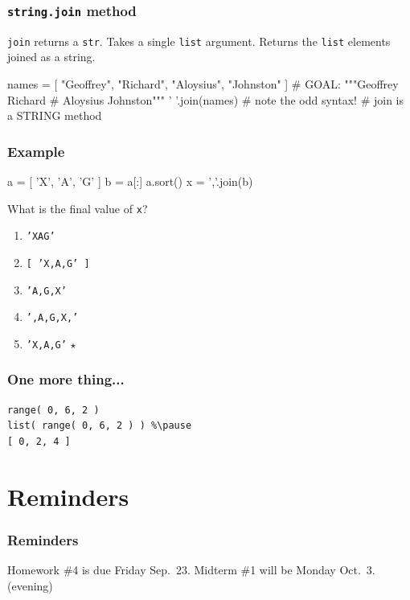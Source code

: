 \documentclass[11pt]{beamer}
\begin{document}
\begin{frame}[fragile]
  \frametitle{\texttt{string.join} method}
  \Enlarge

  \begin{itemize}
  \myitem  \texttt{join} returns a \texttt{str}. %
  \myitem  Takes a single \texttt{list} argument. %
  \myitem  Returns the \texttt{list} elements joined as a string. %
  \end{itemize}
  \begin{semiverbatim}
names = [ "Geoffrey", "Richard",
          "Aloysius", "Johnston" ]
#  GOAL:  """Geoffrey Richard
#            Aloysius Johnston""" %
' '.join(names)     # note the odd syntax!
                    # join is a STRING method
  \end{semiverbatim}
\end{frame}

\begin{frame}[fragile]
  \frametitle{Example}
  \Enlarge

  \begin{semiverbatim}
a = [ 'X', 'A', 'G' ]
b = a[:]
a.sort()
x = ','.join(b)
  \end{semiverbatim}
  What is the final value of \texttt{x}?
  \begin{enumerate}[label=\Alph*]
  \item  \texttt{'XAG'}
  \item  \texttt{[ 'X,A,G' ]}
  \item  \texttt{'A,G,X'}
  \item  \texttt{',A,G,X,'}
  \item  \texttt{'X,A,G'}  $\star$
  \end{enumerate}
\end{frame}

\begin{frame}[fragile]
  \frametitle{One more thing...}
  \Enlarge

  \begin{Verbatim}
range( 0, 6, 2 )
list( range( 0, 6, 2 ) ) %\pause
[ 0, 2, 4 ]
  \end{Verbatim}
\end{frame}

\section{Reminders}

\begin{frame}
  \frametitle{Reminders}
  \Enlarge

  \begin{itemize}
  \myitem  Homework \#4 is due Friday Sep.\ 23.
  \myitem  Midterm \#1 will be Monday Oct.\ 3.  (evening)
  \end{itemize}
\end{frame}
\end{document}
